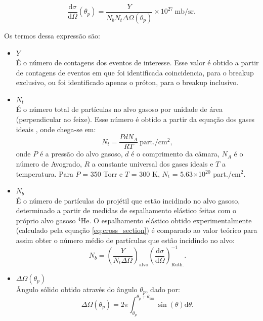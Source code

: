 \documentclass[a4paper,12pt,oneside]{book}
\begin{document}
\begin{equation}\label{eq:cross_section}
	\frac{\mathrm{d}\sigma}{\mathrm{d}\Omega} (\theta_p) = \frac{Y}{N_bN_t\Delta\Omega(\theta_p)}\times 10^{27} \:  \mathrm{mb/sr}.
\end{equation}

\par Os termos dessa expressão são:

\begin{itemize}
	\item $Y$ \hfill \\
    	É o número de contagens dos eventos de interesse. Esse valor é obtido a partir de contagens de eventos em que foi identificada coincidencia, para o breakup exclusivo, ou foi identificado apenas o próton, para o breakup inclusivo.
	\item $N_t$ \hfill \\
		É o número total de partículas no alvo gasoso por unidade de área (perpendicular ao feixe). Esse número é obtido a partir da equação dos gases ideais \cite{termo_mario}, onde chega-se em:
		\begin{equation}
			N_t = \frac{PdN_A}{RT} \: \mathrm{part./cm^2},
		\end{equation}
		onde $P$ é a pressão do alvo gasoso, $d$ é o comprimento da câmara, $N_A$ é o número de Avogrado, $R$ a constante universal dos gases ideais e $T$ a temperatura. Para $P$ = 350 Torr e $T$ = 300 K, $N_t$ = 5.63$\times$10$^{20}$ part./cm$^2$.
	\item $N_b$ \hfill \\
		É o número de partículas do projétil que estão incidindo no alvo gasoso, determinado a partir de medidas de espalhamento elástico feitas com o próprio alvo gasoso $^4$He. O espalhamento elástico obtido experimentalmente (calculado pela equação \ref{eq:cross_section}) é comparado ao valor teórico para assim obter o número médio de partículas que estão incidindo no alvo:
		\begin{equation}
			N_b = \left( \frac{Y}{N_t \Delta\Omega}\right)_{\mathrm{alvo}} \left(\frac{\mathrm{d}\sigma}{\mathrm{d}\Omega}\right)^{-1}_{\mathrm{Ruth.}}.
		\end{equation}		 
	\item $\Delta\Omega(\theta_p)$  \hfill \\
	Ângulo sólido obtido através do ângulo $\theta_p$, dado por:
	\begin{equation}
	\Delta\Omega (\theta_p) = 2\pi \int_{\theta_p}^{\theta_p + \theta_{bin}}\sin(\theta)\mathrm{d}\theta.		
	\end{equation}
\end{itemize}
\end{document}
